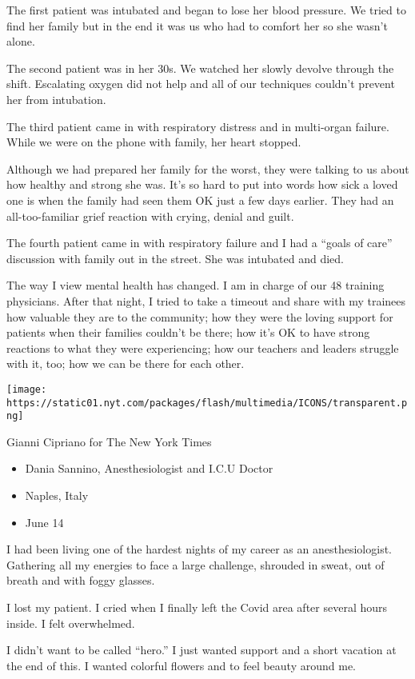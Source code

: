 The first patient was intubated and began to lose her blood pressure. We
tried to find her family but in the end it was us who had to comfort her
so she wasn't alone.

The second patient was in her 30s. We watched her slowly devolve through
the shift. Escalating oxygen did not help and all of our techniques
couldn't prevent her from intubation.

The third patient came in with respiratory distress and in multi-organ
failure. While we were on the phone with family, her heart stopped.

Although we had prepared her family for the worst, they were talking to
us about how healthy and strong she was. It's so hard to put into words
how sick a loved one is when the family had seen them OK just a few days
earlier. They had an all-too-familiar grief reaction with crying, denial
and guilt.

The fourth patient came in with respiratory failure and I had a ``goals
of care'' discussion with family out in the street. She was intubated
and died.

The way I view mental health has changed. I am in charge of our 48
training physicians. After that night, I tried to take a timeout and
share with my trainees how valuable they are to the community; how they
were the loving support for patients when their families couldn't be
there; how it's OK to have strong reactions to what they were
experiencing; how our teachers and leaders struggle with it, too; how we
can be there for each other.

\texttt{[image: https://static01.nyt.com/packages/flash/multimedia/ICONS/transparent.png]}

Gianni Cipriano for The New York Times

\begin{itemize}
\tightlist
\item
  Dania Sannino, Anesthesiologist and I.C.U Doctor
\item
  Naples, Italy
\item
  June 14
\end{itemize}

I had been living one of the hardest nights of my career as an
anesthesiologist. Gathering all my energies to face a large challenge,
shrouded in sweat, out of breath and with foggy glasses.

I lost my patient. I cried when I finally left the Covid area after
several hours inside. I felt overwhelmed.

I didn't want to be called ``hero.'' I just wanted support and a short
vacation at the end of this. I wanted colorful flowers and to feel
beauty around me.

